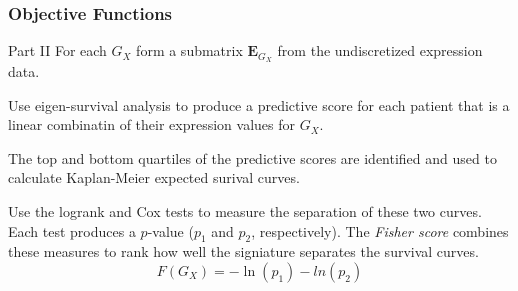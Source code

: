 \documentclass[
	11pt, %
]{beamer}
\begin{document}
\begin{frame}
    \frametitle{Objective Functions}
    \begin{block}{Part II}
        For each $G_X$ form a submatrix $\mathbf{E}_{G_X}$ from the undiscretized expression data.
        
        \smallskip
        
        Use eigen-survival analysis to produce a predictive score for each patient that is a linear combinatin of their expression values for $G_X$.

        \smallskip

        The top and bottom quartiles of the predictive scores are identified and used to calculate Kaplan-Meier expected surival curves.

        \smallskip

        Use the logrank and Cox tests to measure the separation of these two curves. Each test produces a $p$-value ($p_1$ and $p_2$, respectively). The \emph{Fisher score} combines these measures to rank how well the signiature separates the survival curves.
        \begin{equation*}
            F(G_X) = -\ln(p_1)-ln(p_2)
        \end{equation*}
    \end{block}
\end{frame}
\end{document}
